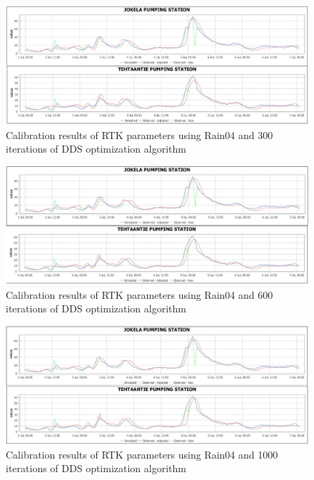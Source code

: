 \begin{figure}[h]
    \centering
	\includegraphics[scale=0.45]{figures/calibration05_rain04_300steps.JPG}
	\caption{Calibration results of RTK parameters using Rain04 and 300 iterations of DDS optimization algorithm}
	\label{fig:calibration05_rain04_300steps}
\end{figure}

\begin{figure}[h]
    \centering
	\includegraphics[scale=0.45]{figures/calibration09_rain04_600steps.JPG}
	\caption{Calibration results of RTK parameters using Rain04 and 600 iterations of DDS optimization algorithm}
	\label{fig:calibration09_rain04_600steps}
\end{figure}

\begin{figure}[hb]
    \centering
	\includegraphics[scale=0.45]{figures/calibration04_rain04_1000steps.JPG}
	\caption{Calibration results of RTK parameters using Rain04 and 1000 iterations of DDS optimization algorithm}
	\label{fig:calibration04_rain04_1000steps}
\end{figure}


